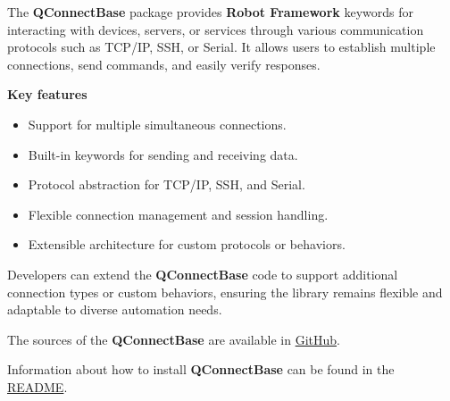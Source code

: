 



The \textbf{QConnectBase} package provides \textbf{Robot Framework} keywords for interacting with devices,
servers, or services through various communication protocols such as TCP/IP, SSH, or Serial.
It allows users to establish multiple connections, send commands, and easily verify responses.

\vspace{2ex}

\textbf{Key features}

\begin{itemize}
   \item Support for multiple simultaneous connections.
   \item Built-in keywords for sending and receiving data.
   \item Protocol abstraction for TCP/IP, SSH, and Serial.
   \item Flexible connection management and session handling.
   \item Extensible architecture for custom protocols or behaviors.
\end{itemize}

Developers can extend the \textbf{QConnectBase} code to support additional connection types or custom behaviors,
ensuring the library remains flexible and adaptable to diverse automation needs.

The sources of the \textbf{QConnectBase} are available in \href{https://github.com/test-fullautomation/robotframework-qconnect-base}{GitHub}.

Information about how to install \textbf{QConnectBase} can be found in the \href{https://github.com/test-fullautomation/robotframework-qconnect-base/blob/develop/README.rst}{README}.

